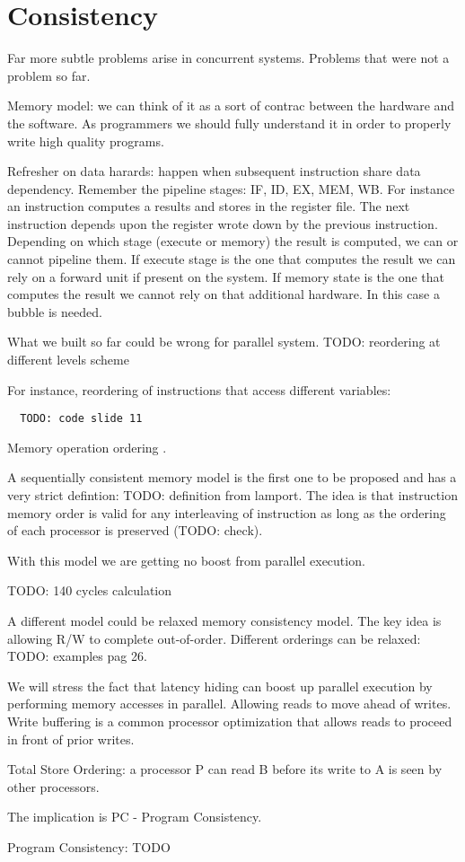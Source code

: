 \section{Consistency}
Far more subtle problems arise in concurrent systems. Problems that were not a problem so far.

Memory model: we can think of it as a sort of contrac between the hardware and the software.
As programmers we should fully understand it in order to properly write high quality programs.

Refresher on data harards: happen when subsequent instruction share data dependency. Remember the pipeline stages: IF, ID, EX, MEM, WB.
For instance an instruction computes a results and stores in the register file.
The next instruction depends upon the register wrote down by the previous instruction.
Depending on which stage (execute or memory) the result is computed, we can or cannot pipeline them.
If execute stage is the one that computes the result we can rely on a forward unit if present on the system.
If memory state is the one that computes the result we cannot rely on that additional hardware. In this case a bubble is needed.

What we built so far could be wrong for parallel system.
TODO: reordering at different levels scheme

For instance, reordering of instructions that access different variables:
\begin{verbatim}
  TODO: code slide 11
\end{verbatim}

Memory operation ordering .

A sequentially consistent memory model is the first one to be proposed and has a very strict defintion: TODO: definition from lamport.
The idea is that instruction memory order is valid for any interleaving of instruction as long as the ordering of each processor is preserved (TODO: check).

With this model we are getting no boost from parallel execution.

TODO: 140 cycles calculation

A different model could be relaxed memory consistency model.
The key idea is allowing R/W to complete out-of-order. Different orderings can be relaxed: TODO: examples pag 26.

We will stress the fact that latency hiding can boost up parallel execution by performing memory accesses in parallel.
Allowing reads to move ahead of writes.
Write buffering is a common processor optimization that allows reads to proceed in front of prior writes.

Total Store Ordering: a processor P can read B before its write to A is seen by other processors.

The implication is PC - Program Consistency.

Program Consistency: TODO